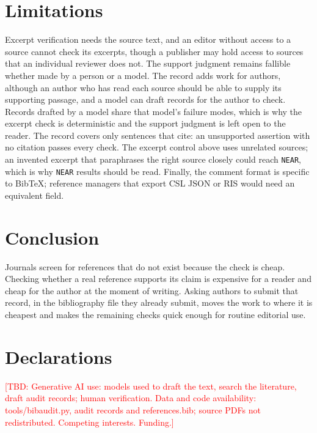 \documentclass[11pt]{article}
\newcommand{\TBD}[1]{\textcolor{red}{[TBD: #1]}}
\begin{document}
\section{Limitations}

Excerpt verification needs the source text, and an editor without access to a source cannot check its excerpts, though a publisher may hold access to sources that an individual reviewer does not. The support judgment remains fallible whether made by a person or a model. The record adds work for authors, although an author who has read each source should be able to supply its supporting passage, and a model can draft records for the author to check. Records drafted by a model share that model's failure modes, which is why the excerpt check is deterministic and the support judgment is left open to the reader. The record covers only sentences that cite: an unsupported assertion with no citation passes every check. The excerpt control above uses unrelated sources; an invented excerpt that paraphrases the right source closely could reach \texttt{NEAR}, which is why \texttt{NEAR} results should be read. Finally, the comment format is specific to BibTeX; reference managers that export CSL JSON or RIS would need an equivalent field.

\section{Conclusion}

Journals screen for references that do not exist because the check is cheap. Checking whether a real reference supports its claim is expensive for a reader and cheap for the author at the moment of writing. Asking authors to submit that record, in the bibliography file they already submit, moves the work to where it is cheapest and makes the remaining checks quick enough for routine editorial use.

\section*{Declarations}
\TBD{Generative AI use: models used to draft the text, search the literature, draft audit records; human verification. Data and code availability: tools/bibaudit.py, audit records and references.bib; source PDFs not redistributed. Competing interests. Funding.}



\end{document}
